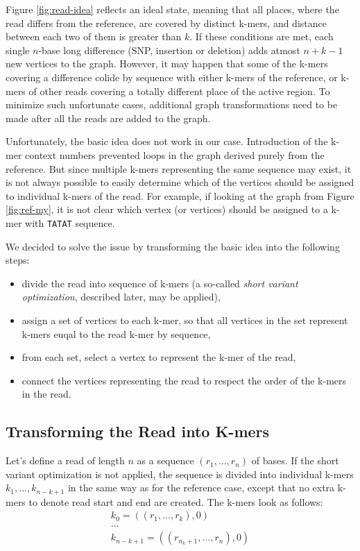 Figure \ref{fig:read-idea} reflects an ideal state, meaning that all places, where the read differs from the reference, are covered by distinct k-mers, and distance between each two of them is greater than $k$. If these conditions are met, each single $n$-base long difference (SNP, insertion or deletion) adds atmost $n+k-1$ new vertices to the graph. However, it may happen that some of the k-mers covering a difference colide by sequence with either k-mers of the reference, or k-mers of other reads covering a totally different place of the active region. To minimize such unfortunate cases, additional graph transformations need to be made after all the reads are added to the graph.

Unfortunately, the basic idea does not work in our case. Introduction of the k-mer context numbers prevented loops in the graph derived purely from the reference. But since multiple k-mers representing the same sequence may exist, it is not always possible to easily determine which of the vertices should be assigned to individual k-mers of the read. For example, if looking at the graph from Figure \ref{fig:ref-my}, it is not clear which vertex (or vertices) should be assigned to a k-mer with \texttt{TATAT} sequence. 

We decided to solve the issue by transforming the basic idea into the following steps:
\begin{itemize}
\item divide the read into sequence of k-mers (a so-called \textit{short variant optimization}, described later, may be applied),
\item assign a set of vertices to each k-mer, so that all vertices in the set represent k-mers euqal to the read k-mer by sequence,
\item from each set, select a vertex to represent the k-mer of the read,
\item connect the vertices representing the read to respect the order of the k-mers in the read.
\end{itemize}

\subsection{Transforming the Read into K-mers}
\label{subsec:transforming-the-read-info-k-mers}

Let's define a read of length $n$ as a sequence $(r_1, ..., r_n)$ of bases. If the short variant optimization is not applied, the sequence is divided into individual k-mers $k_1, ..., k_{n-k+1}$ in the same way as for the reference case, except that no extra k-mers to denote read start and end are created. The k-mers look as follows:
\begin{gather}
k_0 = ((r_1, ..., r_k), 0) \\
... \\
k_{n-k+1} = ((r_{n_k+1}, ...,r_n), 0)
\end{gather}

